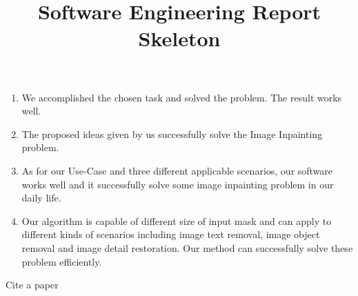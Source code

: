 \documentclass{article}
\title{Software Engineering Report Skeleton}
\begin{document}
\maketitle

\begin{enumerate}
	\item We accomplished the chosen task and solved the problem. The result works well.
	\item The proposed ideas given by us successfully solve the Image Inpainting problem.
	\item As for our Use-Case and three different applicable scenarios, our software works well and it successfully solve some image inpainting problem in our daily life. 
	\item Our algorithm is capable of different size of input mask and can apply to different kinds of scenarios including image text removal, image object removal and image detail restoration. Our method can successfully solve these problem efficiently.
\end{enumerate}







\newpage
Cite a paper\cite{DBLP:conf/siggraph/BertalmioSCB00}


\end{document}
